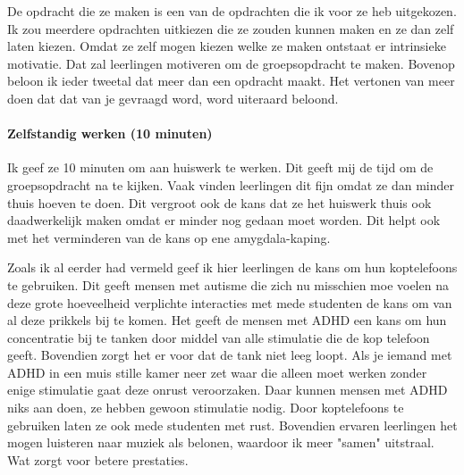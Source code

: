                     \noindent De opdracht die ze maken is een van de opdrachten die ik voor ze heb uitgekozen. Ik zou meerdere opdrachten uitkiezen die ze zouden kunnen maken en ze dan zelf laten kiezen. Omdat ze zelf mogen kiezen welke ze maken ontstaat er intrinsieke motivatie.\cite{NAME-ME} Dat zal leerlingen motiveren om de groepsopdracht te maken. Bovenop beloon ik ieder tweetal dat meer dan een opdracht maakt. Het vertonen van meer doen dat dat van je gevraagd word, word uiteraard beloond.
                    
                \paragraph{Zelfstandig werken (10 minuten)}
                    Ik geef ze 10 minuten om aan huiswerk te werken. Dit geeft mij de tijd om de groepsopdracht na te kijken. Vaak vinden leerlingen dit fijn omdat ze dan minder thuis hoeven te doen. Dit vergroot ook de kans dat ze het huiswerk thuis ook daadwerkelijk maken omdat er minder nog gedaan moet worden.\cite{more-homework-equals-bad} Dit helpt ook met het verminderen van de kans op ene amygdala-kaping.\cite{more-homework-equals-bad} 

                    \bigskip

                    \noindent Zoals ik al eerder had vermeld geef ik hier leerlingen de kans om hun koptelefoons te gebruiken. Dit geeft mensen met autisme die zich nu misschien moe voelen na deze grote hoeveelheid verplichte interacties met mede studenten de kans om van al deze prikkels bij te komen. Het geeft de mensen met ADHD een kans om hun concentratie bij te tanken door middel van alle stimulatie die de kop telefoon geeft. Bovendien zorgt het er voor dat de tank niet leeg loopt. Als je iemand met ADHD in een muis stille kamer neer zet waar die alleen moet werken zonder enige stimulatie gaat deze onrust veroorzaken. Daar kunnen mensen met ADHD niks aan doen, ze hebben gewoon stimulatie nodig. Door koptelefoons te gebruiken laten ze ook mede studenten met rust. Bovendien ervaren leerlingen het mogen luisteren naar muziek als belonen, waardoor ik meer "samen" uitstraal. Wat zorgt voor betere prestaties.\cite{samen-boven-leads-to-better-results}
                    
